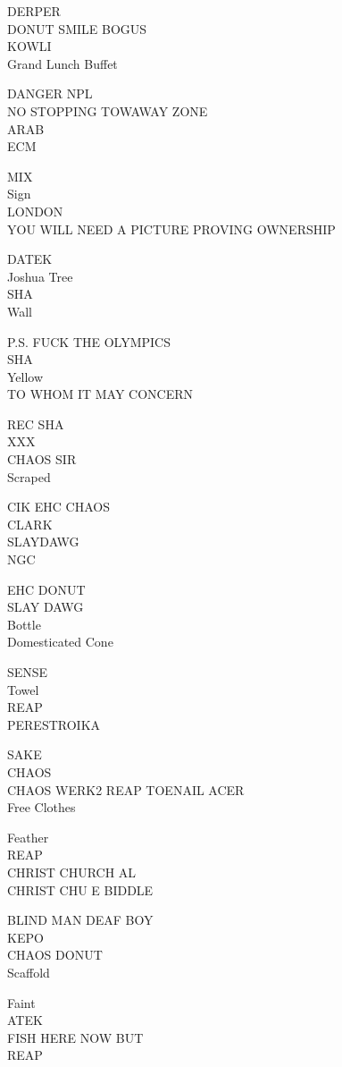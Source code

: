 \documentclass[10pt,letterpaper]{article}
\begin{document}
DERPER\\
DONUT SMILE BOGUS\\
KOWLI\\
Grand Lunch Buffet

DANGER NPL\\
NO STOPPING TOWAWAY ZONE\\
ARAB\\
ECM

MIX\\
Sign\\
LONDON\\
YOU WILL NEED A PICTURE PROVING OWNERSHIP

DATEK\\
Joshua Tree\\
SHA\\
Wall

P.S. FUCK THE OLYMPICS\\
SHA\\
Yellow\\
TO WHOM IT MAY CONCERN

REC SHA\\
XXX\\
CHAOS SIR\\
Scraped

CIK EHC CHAOS\\
CLARK\\
SLAYDAWG\\
NGC

EHC DONUT\\
SLAY DAWG\\
Bottle\\
Domesticated Cone

SENSE\\
Towel\\
REAP\\
PERESTROIKA

SAKE\\
CHAOS\\
CHAOS WERK2 REAP TOENAIL ACER\\
Free Clothes

Feather\\
REAP\\
CHRIST CHURCH AL\\
CHRIST CHU E BIDDLE

BLIND MAN DEAF BOY\\
KEPO\\
CHAOS DONUT\\
Scaffold

Faint\\
ATEK\\
FISH HERE NOW BUT\\
REAP
\end{document}
